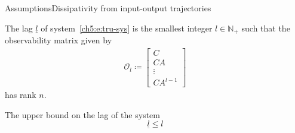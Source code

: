\documentclass[aspectratio=169, handout, 10pt, hyperref=colorlinks]{beamer}
\begin{document}
\begin{frame}{Assumptions}{Dissipativity from input-output trajectories}
    \begin{definition}
    The lag $\underline{l}$ of system~\eqref{ch5:e:tru-sys} is the smallest integer $l \in \mathbb{N}_{+}$ such that the observability matrix given by 
    \begin{align*}
    \mathcal{O}_l \coloneqq \begin{bmatrix} C \\ CA \\ \vdots \\ CA^{l-1}
    \end{bmatrix}
    \end{align*}
    has rank $n$.
    \label{def:lag}
    \end{definition}
    The upper bound on the lag of the system $$\underline{l} \leq l$$
\end{frame}
\end{document}
